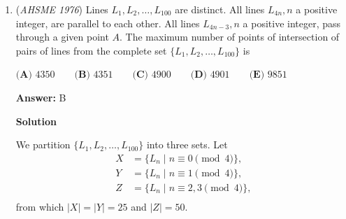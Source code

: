 \begin{enumerate}
 
            \begin{enumerate} 
        \item Let $\sqrt{a}+\sqrt{b}=\sqrt{3+\sqrt{5}}$ for some nonnegative rational numbers $a$ and $b.$ We square both sides of this equation, then rearrange:
 \begin{align*} a+b+2\sqrt{ab}&=3+\sqrt{5} \\ a+b+\sqrt{4ab}&=3+\sqrt{5}. \end{align*}
It follows that
 \begin{align*} a+b&=3, \\ ab&=\frac54. \end{align*}
By inspection, we get $\{a,b\}=\left\{\frac12,\frac52\right\}.$ Alternatively, we conclude that $a$ and $b$ are the solutions to the quadratic equation $t^2-3t+\frac54=0$ by Vieta's Formulas, in which $t=\frac12,\frac52.$  Therefore, we obtain 
 \[\sqrt{3+\sqrt{5}}=\sqrt{\frac12}+\sqrt{\frac52}=\frac{\sqrt2}{2}+\frac{\sqrt{10}}{2}.\]


        \item Similarly, we obtain 
 \[\sqrt{7-3\sqrt{5}}=\frac{3\sqrt2}{2}-\frac{\sqrt{10}}{2}.\]

            \end{enumerate}
            Substituting these results into $(\bigstar),$ we have 
 \[x=\frac{\left(\frac{\sqrt2}{2}+\frac{\sqrt{10}}{2}\right)+\left(\frac{3\sqrt2}{2}-\frac{\sqrt{10}}{2}\right)}{2}=\sqrt2.\]On the other hand, we have 
 \[y=\sqrt2-1\] by the argument of either Solution 1 or Solution 2.

 Finally, the answer is 
 \[N=x-y=\boxed{\textbf{(A) }1}.\]



	\item (\textit{AHSME 1976}) Lines $L_1,L_2,\dots,L_{100}$ are distinct. All lines $L_{4n}, n$ a positive integer, are parallel to each other. 
All lines $L_{4n-3}, n$ a positive integer, pass through a given point $A.$ The maximum number of points of intersection of pairs of lines from the complete set $\{L_1,L_2,\dots,L_{100}\}$ is


 $\textbf{(A) }4350\qquad \textbf{(B) }4351\qquad \textbf{(C) }4900\qquad \textbf{(D) }4901\qquad  \textbf{(E) }9851$

 \textbf{Answer: }B



\textbf{Solution}

We partition $\{L_1,L_2,\dots,L_{100}\}$ into three sets. Let
 \begin{align*} X &= \{L_n\mid n\equiv0\pmod{4}\}, \\ Y &= \{L_n\mid n\equiv1\pmod{4}\}, \\ Z &= \{L_n\mid n\equiv2,3\pmod{4}\}, \\ \end{align*}
from which $|X|=|Y|=25$ and $|Z|=50.$


\end{enumerate}

